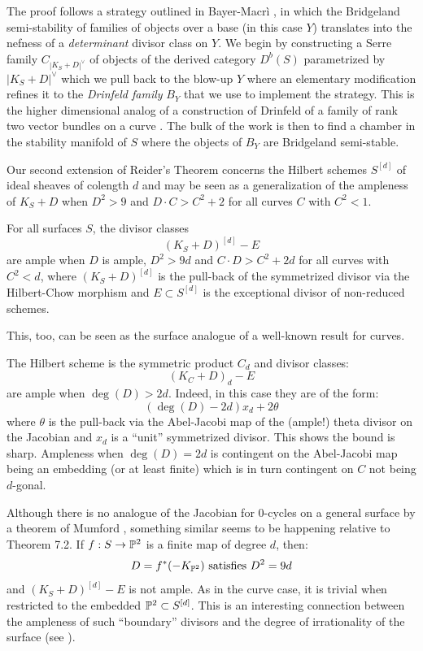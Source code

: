 \documentclass{amsart}
\begin{document}
\medskip


The proof follows a strategy outlined in Bayer-Macr\`i \cite{BM3}, in which the Bridgeland semi-stability of families of 
objects over a base (in this case $Y$) translates into the nefness of a {\it determinant} divisor class on $Y$. 
We begin by constructing a Serre family $C_{|K_S + D|^\vee}$ of objects
of the derived category $D^b(S)$ parametrized by $|K_S + D|^\vee$ which we pull back to the blow-up 
$Y$ where an elementary modification refines it to the {\it Drinfeld family} $B_Y$ that we use to implement the strategy. 
This is the higher dimensional analog of a construction of Drinfeld of a family 
of rank two vector bundles on a curve \cite{Be}.
The bulk of the work is then to find a chamber in the stability manifold of $S$ where the objects of $B_Y$ are 
Bridgeland semi-stable.

\medskip

Our second extension of Reider's Theorem concerns the Hilbert schemes $S^{[d]}$ 
of ideal sheaves of colength $d$ and may be seen as a generalization of the ampleness of $K_S + D$ when 
$D^2 > 9$ and $D \cdot C > C^2 + 2$ for all curves $C$ with $C^2 < 1$. 

\medskip

 For all surfaces $S$, the divisor classes 
\[ (K_S + D)^{[d]} - E\] 
are ample when
 $D$ is ample, $D^2 > 9d$ and $C \cdot D > C^2 + 2d$ for all curves with $C^2 < d$, 
where $(K_S + D)^{[d]}$ is the pull-back of the symmetrized divisor via the Hilbert-Chow morphism and
$E \subset S^{[d]}$ is the exceptional divisor of non-reduced schemes. 

\medskip

This, too, can be seen as the surface analogue of a well-known result for curves. 

\medskip

 The Hilbert scheme is the symmetric product $C_d$ and divisor classes: 
\[ (K_C + D)_d - E \] 
are ample when $\deg(D) > 2d$. Indeed, in this case they are of the form: 
\[ (\deg(D) - 2d)x_d + 2\theta \] 
where $\theta$ is the pull-back via the Abel-Jacobi map of the (ample!) theta divisor on the 
Jacobian \cite{ACGH} and $x_d$ is a ``unit'' symmetrized divisor.  This shows
the bound is sharp. Ampleness when $\deg(D) = 2d$ is contingent on the Abel-Jacobi map 
being an embedding (or at least finite) which is in turn contingent on $C$ not being $d$-gonal. 

\medskip

Although there is no analogue of the Jacobian for $0$-cycles on a general surface by a theorem of Mumford \cite{Mu}, something similar 
seems to be happening relative to Theorem 7.2. If $f:S \rightarrow {\mathbb P}^2$ is a finite map of degree $d$, then:
\[ D = f^*(-K_{\PP^2}) \ \mbox{satisfies} \ D^2 = 9d \]
and $(K_S + D)^{[d]} - E$ is not ample. As in the curve case, it is trivial when restricted to the embedded  ${\mathbb P}^2 \subset S^{[d]}$.  
This is an interesting connection between the ampleness of such ``boundary'' divisors and  the {degree of irrationality} of the surface  (see \cite{BDELU}).
\end{document}
